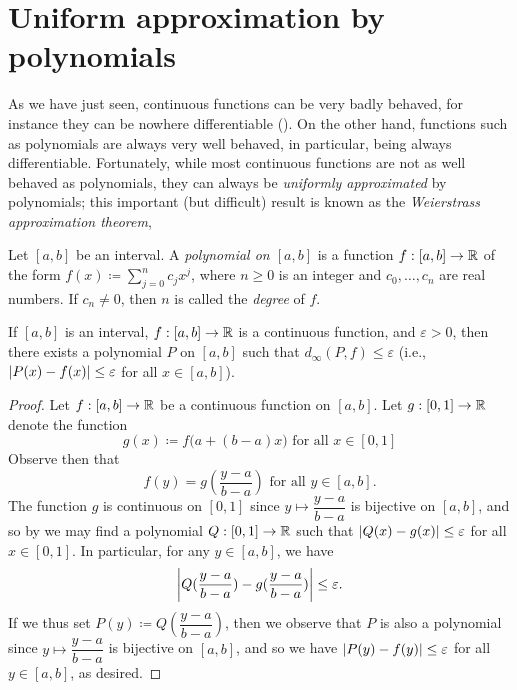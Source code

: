 \section{Uniform approximation by polynomials}\label{ii:sec:3.8}

\begin{note}
  As we have just seen, continuous functions can be very badly behaved, for instance they can be nowhere differentiable ().
  On the other hand, functions such as polynomials are always very well behaved, in particular, being always differentiable.
  Fortunately, while most continuous functions are not as well behaved as polynomials, they can always be \emph{uniformly approximated} by polynomials; this important (but difficult) result is known as the \emph{Weierstrass approximation theorem},
\end{note}

\begin{defn}\label{ii:3.8.1}
  Let \([a, b]\) be an interval.
  A \emph{polynomial on \([a, b]\)} is a
  function \(f : [a, b] \to \mathbb{R}\) of the form \(f(x) \coloneqq \sum_{j = 0}^n c_j x^j\), where \(n \geq 0\) is an integer and \(c_0, \dots, c_n\) are real numbers.
  If \(c_n \neq 0\), then \(n\) is called the \emph{degree} of \(f\).
\end{defn}

\setcounter{thm}{2}
\begin{thm}\label{ii:3.8.3}
  If \([a, b]\) is an interval, \(f : [a, b] \to \mathbb{R}\) is a continuous function, and \(\varepsilon > 0\), then there exists a polynomial \(P\) on \([a, b]\) such that \(d_\infty(P, f) \leq \varepsilon\)
  (i.e., \(\left\lvert P(x) - f(x)\right\rvert \leq \varepsilon\) for all \(x \in [a, b]\)).
\end{thm}

\begin{proof}
  Let \(f : [a, b] \to \mathbb{R}\) be a continuous function on \([a, b]\).
  Let \(g : [0, 1] \to \mathbb{R}\) denote the function
  \[
    g(x) \coloneqq f\big(a + (b - a) x\big) \text{ for all } x \in [0, 1]
  \]
  Observe then that
  \[
    f(y) = g(\dfrac{y - a}{b - a}) \text{ for all } y \in [a, b].
  \]
  The function \(g\) is continuous on \([0, 1]\) since \(y \mapsto \dfrac{y - a}{b - a}\) is bijective on \([a, b]\), and so by  we may find a polynomial \(Q : [0, 1] \to \mathbb{R}\) such that \(\left\lvert Q(x) - g(x)\right\rvert \leq \varepsilon\) for all \(x \in [0, 1]\).
  In particular, for any \(y \in [a, b]\), we have
  \[
    \left\lvert Q(\dfrac{y - a}{b - a}) - g(\dfrac{y - a}{b - a})\right\rvert \leq \varepsilon.
  \]
  If we thus set \(P(y) \coloneqq Q(\dfrac{y - a}{b - a})\), then we observe that \(P\) is also a polynomial since \(y \mapsto \dfrac{y - a}{b - a}\) is bijective on \([a, b]\), and so we have \(\left\lvert P(y) - f(y)\right\rvert \leq \varepsilon\) for all \(y \in [a, b]\), as desired.
\end{proof}

